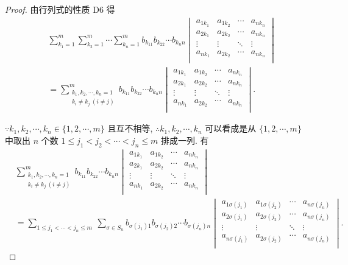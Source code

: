 \documentclass{ctexart}
\begin{document}
\begin{proof}
    由行列式的性质 D6 得
    \begin{align*}
        & \sum_{k_1=1}^m\sum_{k_2=1}^m\cdots\sum_{k_n=1}^mb_{k_11}b_{k_22}\cdots b_{k_nn}\begin{vmatrix}
            a_{1k_1} & a_{1k_2} & \cdots & a_{nk_n} \\
            a_{2k_1} & a_{2k_2} & \cdots & a_{nk_n} \\
            \vdots & \vdots & \ddots & \vdots \\
            a_{nk_1} & a_{2k_2} & \cdots & a_{nk_n} \\
        \end{vmatrix} \\
        & =\sum_{\substack{k_1,k_2,\cdots,k_n=1\\k_i\neq k_j\ (i\neq j)}}^mb_{k_11}b_{k_22}\cdots b_{k_nn}\begin{vmatrix}
            a_{1k_1} & a_{1k_2} & \cdots & a_{nk_n} \\
            a_{2k_1} & a_{2k_2} & \cdots & a_{nk_n} \\
            \vdots & \vdots & \ddots & \vdots \\
            a_{nk_1} & a_{2k_2} & \cdots & a_{nk_n} \\
        \end{vmatrix}.
    \end{align*}

    $\because k_1,k_2,\cdots,k_n\in\{1,2,\cdots,m\}$ 且互不相等, $\therefore k_1,k_2,\cdots,k_n$ 可以看成是从 $\{1,2,\cdots,m\}$ 中取出 $n$ 个数 $1\leq j_1<j_2<\cdots<j_n\leq m$ 排成一列. 有
    \begin{align*}
        & \sum_{\substack{k_1,k_2,\cdots,k_n=1\\k_i\neq k_j\ (i\neq j)}}^mb_{k_11}b_{k_22}\cdots b_{k_nn}\begin{vmatrix}
            a_{1k_1} & a_{1k_2} & \cdots & a_{nk_n} \\
            a_{2k_1} & a_{2k_2} & \cdots & a_{nk_n} \\
            \vdots & \vdots & \ddots & \vdots \\
            a_{nk_1} & a_{2k_2} & \cdots & a_{nk_n} \\
        \end{vmatrix} \\
        & =\sum\limits_{1\leq j_1<\cdots<j_n\leq m}\ \sum_{\sigma\in S_n}b_{\sigma(j_1)1}b_{\sigma(j_2)2}\cdots b_{\sigma(j_n)n}\begin{vmatrix}
            a_{1\sigma(j_1)} & a_{1\sigma(j_2)} & \cdots & a_{n\sigma(j_n)} \\
            a_{2\sigma(j_1)} & a_{2\sigma(j_2)} & \cdots & a_{n\sigma(j_n)} \\
            \vdots & \vdots & \ddots & \vdots \\
            a_{n\sigma(j_1)} & a_{2\sigma(j_2)} & \cdots & a_{n\sigma(j_n)} \\
        \end{vmatrix}.
    \end{align*}


\end{proof}
\end{document}
